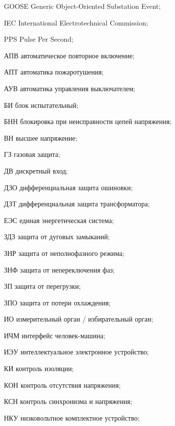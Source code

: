 \begin{list}{}%
{%
  \setlength{\labelwidth}{\abbrwidth}%
  \setlength{\labelsep}{0pt}%
  \setlength{\leftmargin}{\dimexpr\labelwidth+\labelsep\relax}%
  \setlength{\itemindent}{0pt}%
  \setlength{\parsep}{0pt}%
  \setlength{\itemsep}{0pt}
  \renewcommand{\makelabel}[1]{#1 --\hspace{\abbrgap}}%
}
\item[GOOSE] Generic Object-Oriented Substation Event;
\item[IEC]  International Electrotechnical Commission;
\item[PPS] Pulse Per Second;
\item[АПВ] автоматическое повторное включение;
\item[АПТ] автоматика пожаротушения;
\item[АУВ] автоматика управления выключателем;
\item[БИ] блок испытательный;
\item[БНН] блокировка при неисправности цепей напряжения;
\item[ВН] высшее напряжение;
\item[ГЗ] газовая защита;
\item[ДВ] дискретный вход;
\item[ДЗО] дифференциальная защита ошиновки;
\item[ДЗТ] дифференциальная защита трансформатора;
\item[ЕЭС] единая энергетическая система;
\item[ЗДЗ] защита от дуговых замыканий;
\item[ЗНР] защита от неполнофазного режима;
\item[ЗНФ] защита от непереключения фаз;
\item[ЗП] защита от перегрузки;
\item[ЗПО] защита от потери охлаждения;
\item[ИО] измерительный орган / избирательный орган;
\item[ИЧМ] интерфейс человек-машина;
\item[ИЭУ] интеллектуальное электронное устройство;
\item[КИ] контроль изоляции;
\item[КОН] контроль отсутствия напряжения;
\item[КСН] контроль синхронизма и напряжения;
\item[НКУ] низковольтное комплектное устройство;

\end{list}
